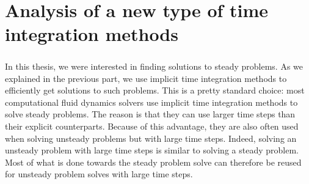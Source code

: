 \chapter{Analysis of a new type of time integration methods}

  \paragraph{}
  In this thesis, we were interested in finding solutions to steady problems.
  As we explained in the previous part, we use implicit time integration methods to efficiently get solutions to such problems.
  This is a pretty standard choice: most computational fluid dynamics solvers use implicit time integration methods to solve steady problems.
  The reason is that they can use larger time steps than their explicit counterparts.
  Because of this advantage, they are also often used when solving unsteady problems but with large time steps.
  Indeed, solving an unsteady problem with large time steps is similar to solving a steady problem.
  Most of what is done towards the steady problem solve can therefore be reused for unsteady problem solves with large time steps.


